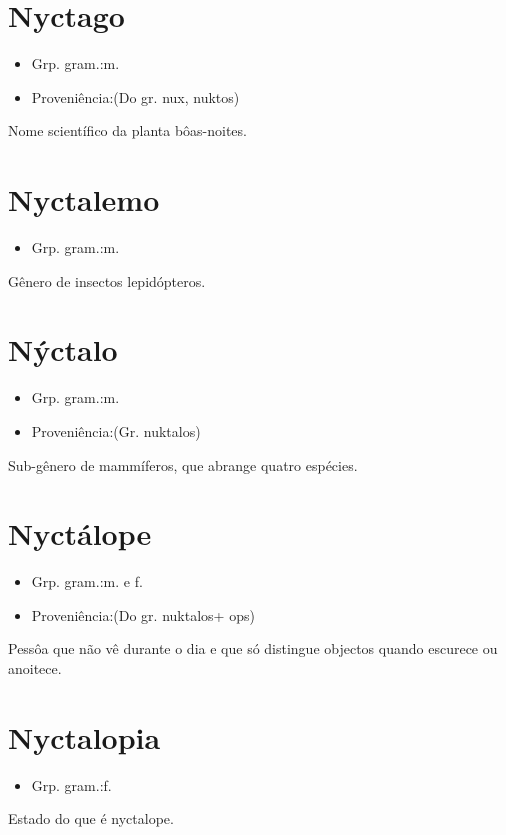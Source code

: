 \section{Nyctago}
\begin{itemize}
\item {Grp. gram.:m.}
\end{itemize}
\begin{itemize}
\item {Proveniência:(Do gr. \textunderscore nux\textunderscore , \textunderscore nuktos\textunderscore )}
\end{itemize}
Nome scientífico da planta bôas-noites.
\section{Nyctalemo}
\begin{itemize}
\item {Grp. gram.:m.}
\end{itemize}
Gênero de insectos lepidópteros.
\section{Nýctalo}
\begin{itemize}
\item {Grp. gram.:m.}
\end{itemize}
\begin{itemize}
\item {Proveniência:(Gr. \textunderscore nuktalos\textunderscore )}
\end{itemize}
Sub-gênero de mammíferos, que abrange quatro espécies.
\section{Nyctálope}
\begin{itemize}
\item {Grp. gram.:m.  e  f.}
\end{itemize}
\begin{itemize}
\item {Proveniência:(Do gr. \textunderscore nuktalos\textunderscore  + \textunderscore ops\textunderscore )}
\end{itemize}
Pessôa que não vê durante o dia e que só distingue objectos quando escurece ou anoitece.
\section{Nyctalopia}
\begin{itemize}
\item {Grp. gram.:f.}
\end{itemize}
Estado do que é nyctalope.
